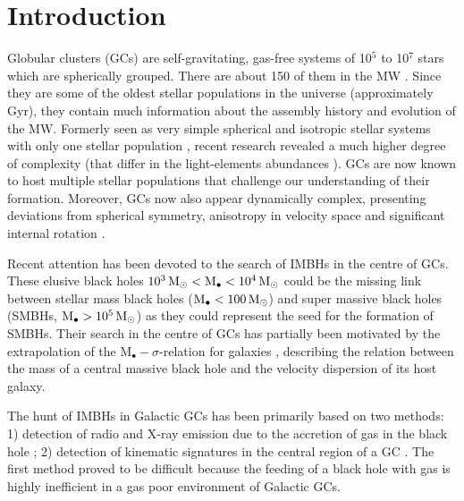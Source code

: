 

\section{Introduction}\label{sec:Introduction}
Globular clusters (\acsp{GC}) are self-gravitating, gas-free systems of 10\(^5\) to 10\(^7\) stars which are spherically grouped. There are about 150 of them in the \ac{MW} \citep{1996AJ....112.1487H}. Since they are some of the oldest stellar populations in the universe (approximately \unit[13]{Gyr}), they contain much information about the assembly history and evolution of the \ac{MW}. Formerly seen as very simple spherical and isotropic stellar systems with only one stellar population \citep{1997A&ARv...8....1M}, recent research revealed a much higher degree of complexity (that differ in the light-elements abundances \citep{2015AJ....149...91P}). \acp{GC} are now known to host multiple stellar populations that challenge our understanding of their formation. Moreover, \acp{GC} now also appear dynamically complex, presenting deviations from spherical symmetry, anisotropy in velocity space and significant internal rotation \citep{2012A&A...539A..65Z,2013ApJ...772...67B,2014A&A...567A..69K}.
\par Recent attention has been devoted to the search of \acp{IMBH} in the centre of \acp{GC}. These elusive black holes \(\unit[10^3]{\mathrm{M}_\odot} < \mathrm{M}_\bullet < \unit[10^4]{\mathrm{M}_\odot}\) could be the missing link between stellar mass black holes (\(\mathrm{M}_\bullet < \unit[100]{\mathrm{M}_\odot}\)) and super massive black holes (\acsp{SMBH}, \(\mathrm{M}_\bullet > \unit[10^5]{\mathrm{M}_\odot}\)) as they could represent the seed for the formation of \acp{SMBH}. Their search in the centre of \acp{GC} has partially been motivated by the extrapolation of the \(\mathrm{M}_\bullet-\sigma\)-relation for galaxies \citep{2000ApJ...539L...9F}, describing the relation between the mass of a central massive black hole and the velocity dispersion of its host galaxy.
\par The hunt of \acp{IMBH} in Galactic \acp{GC} has been primarily based on two methods: 1) detection of radio and X-ray emission due to the accretion of gas in the black hole \citep{2002MNRAS.330..232C,2008MNRAS.389..379M,2012A&A...542A..44K,2012ApJ...750L..27S}; 2) detection of kinematic signatures in the central region of a \ac{GC} \citep{1976ApJ...209..214B,2013A&A...552A..49L}. The first method proved to be difficult because the feeding of a black hole with gas is highly inefficient in a gas poor environment of Galactic \acp{GC}. 
